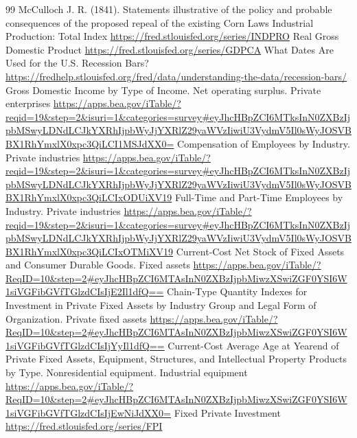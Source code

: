 \begin{RaggedRight}
\begin{thebibliography}{99}
     \hypertarget{bib:McCulloch-1841}{} McCulloch J. R. (1841). Statements illustrative of the policy and probable consequences of the proposed repeal of the existing Corn Laws
     \hypertarget{bib:FRED-INDPRO}{} Industrial Production: Total Index \url{https://fred.stlouisfed.org/series/INDPRO}
     \hypertarget{bib:FRED-GDPCA}{} Real Gross Domestic Product \url{https://fred.stlouisfed.org/series/GDPCA}
     \hypertarget{bib:NBER}{} What Dates Are Used for the U.S. Recession Bars? \url{https://fredhelp.stlouisfed.org/fred/data/understanding-the-data/recession-bars/}
     \hypertarget{bib:BEA-1.10}{} Gross Domestic Income by Type of Income. Net operating surplus. Private enterprises \url{https://apps.bea.gov/iTable/?reqid=19&step=2&isuri=1&categories=survey#eyJhcHBpZCI6MTksInN0ZXBzIjpbMSwyLDNdLCJkYXRhIjpbWyJjYXRlZ29yaWVzIiwiU3VydmV5Il0sWyJOSVBBX1RhYmxlX0xpc3QiLCI1MSJdXX0=}
     \hypertarget{bib:BEA-6.2}{} Compensation of Employees by Industry. Private industries \url{https://apps.bea.gov/iTable/?reqid=19&step=2&isuri=1&categories=survey#eyJhcHBpZCI6MTksInN0ZXBzIjpbMSwyLDNdLCJkYXRhIjpbWyJjYXRlZ29yaWVzIiwiU3VydmV5Il0sWyJOSVBBX1RhYmxlX0xpc3QiLCIxODUiXV19}
     \hypertarget{bib:BEA-6.4}{} Full-Time and Part-Time Employees by Industry. Private industries \url{https://apps.bea.gov/iTable/?reqid=19&step=2&isuri=1&categories=survey#eyJhcHBpZCI6MTksInN0ZXBzIjpbMSwyLDNdLCJkYXRhIjpbWyJjYXRlZ29yaWVzIiwiU3VydmV5Il0sWyJOSVBBX1RhYmxlX0xpc3QiLCIxOTMiXV19}
     \hypertarget{bib:BEA-1.1}{} Current-Cost Net Stock of Fixed Assets and Consumer Durable Goods. Fixed assets \url{https://apps.bea.gov/iTable/?ReqID=10&step=2#eyJhcHBpZCI6MTAsInN0ZXBzIjpbMiwzXSwiZGF0YSI6W1siVGFibGVfTGlzdCIsIjE2Il1dfQ==}
     \hypertarget{bib:BEA-6.8}{} Chain-Type Quantity Indexes for Investment in Private Fixed Assets by Industry Group and Legal Form of Organization. Private fixed assets \url{https://apps.bea.gov/iTable/?ReqID=10&step=2#eyJhcHBpZCI6MTAsInN0ZXBzIjpbMiwzXSwiZGF0YSI6W1siVGFibGVfTGlzdCIsIjYyIl1dfQ==}
     \hypertarget{bib:BEA-2.9}{} Current-Cost Average Age at Yearend of Private Fixed Assets, Equipment, Structures, and Intellectual Property Products by Type. Nonresidential equipment. Industrial equipment \url{https://apps.bea.gov/iTable/?ReqID=10&step=2#eyJhcHBpZCI6MTAsInN0ZXBzIjpbMiwzXSwiZGF0YSI6W1siVGFibGVfTGlzdCIsIjEwNiJdXX0=}
     \hypertarget{bib:FRED-FPI}{} Fixed Private Investment \url{https://fred.stlouisfed.org/series/FPI}

\end{thebibliography}
\end{RaggedRight}
